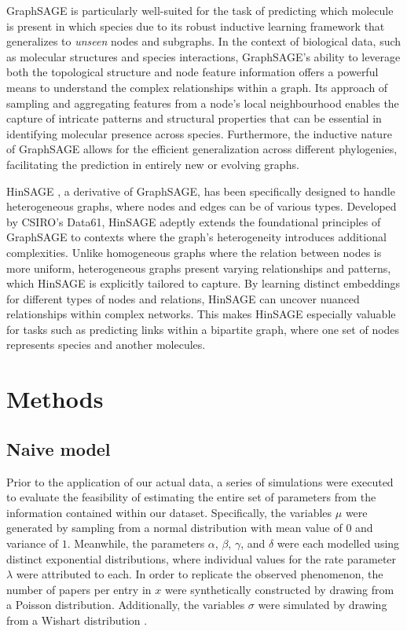 \documentclass[
11pt, %
oneside, %
english, %
singlespacing, %
headsepline, %
chapterinoneline, %
]{MastersDoctoralThesis} %
\begin{document}
GraphSAGE is particularly well-suited for the task of predicting which molecule is present in which species due to its robust inductive learning framework that generalizes to \textit{unseen} nodes and subgraphs. In the context of biological data, such as molecular structures and species interactions, GraphSAGE's ability to leverage both the topological structure and node feature information offers a powerful means to understand the complex relationships within a graph. Its approach of sampling and aggregating features from a node's local neighbourhood enables the capture of intricate patterns and structural properties that can be essential in identifying molecular presence across species. Furthermore, the inductive nature of GraphSAGE allows for the efficient generalization across different phylogenies, facilitating the prediction in entirely new or evolving graphs.

HinSAGE \cite{StellarGraphMachineLearning2018}, a derivative of GraphSAGE, has been specifically designed to handle heterogeneous graphs, where nodes and edges can be of various types. Developed by CSIRO's Data61, HinSAGE adeptly extends the foundational principles of GraphSAGE to contexts where the graph's heterogeneity introduces additional complexities. Unlike homogeneous graphs where the relation between nodes is more uniform, heterogeneous graphs present varying relationships and patterns, which HinSAGE is explicitly tailored to capture. By learning distinct embeddings for different types of nodes and relations, HinSAGE can uncover nuanced relationships within complex networks. This makes HinSAGE especially valuable for tasks such as predicting links within a bipartite graph, where one set of nodes represents species and another molecules. 

\chapter{Methods}\label{chap:Methods}
\section{Naive model}
Prior to the application of our actual data, a series of simulations were executed to evaluate the feasibility of estimating the entire set of parameters from the information contained within our dataset. Specifically, the variables $\mu$ were generated by sampling from a normal distribution with mean value of $0$ and variance of $1$. Meanwhile, the parameters $\alpha$, $\beta$, $\gamma$, and $\delta$ were each modelled using distinct exponential distributions, where individual values for the rate parameter $\lambda$ were attributed to each. In order to replicate the observed phenomenon, the number of papers per entry in $x$ were synthetically constructed by drawing from a Poisson distribution. Additionally, the variables $\sigma$ were simulated by drawing from a Wishart distribution \cite{wishartGENERALISEDPRODUCTMOMENT1928}.
\end{document}

